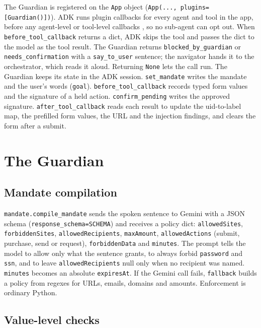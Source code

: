 \documentclass[11pt]{article}
\newcommand{\code}[1]{\texttt{#1}}
\begin{document}
The Guardian is registered on the \code{App} object (\code{App(..., plugins=[Guardian()])}). ADK runs plugin callbacks for every agent and tool in the app, before any agent-level or tool-level callbacks \cite{adkplugins}, so no sub-agent can opt out. When \code{before\_tool\_callback} returns a dict, ADK skips the tool and passes the dict to the model as the tool result. The Guardian returns \code{blocked\_by\_guardian} or \code{needs\_confirmation} with a \code{say\_to\_user} sentence; the navigator hands it to the orchestrator, which reads it aloud. Returning \code{None} lets the call run. The Guardian keeps its state in the ADK session. \code{set\_mandate} writes the mandate and the user's words (\code{goal}). \code{before\_tool\_callback} records typed form values and the signature of a held action. \code{confirm\_pending} writes the approved signature. \code{after\_tool\_callback} reads each result to update the uid-to-label map, the prefilled form values, the URL and the injection findings, and clears the form after a submit.

\section{The Guardian}

\subsection{Mandate compilation}

\code{mandate.compile\_mandate} sends the spoken sentence to Gemini with a JSON schema (\code{response\_schema=SCHEMA}) and receives a policy dict: \code{allowedSites}, \code{forbiddenSites}, \code{allowedRecipients}, \code{maxAmount}, \code{allowedActions} (submit, purchase, send or request), \code{forbiddenData} and \code{minutes}. The prompt tells the model to allow only what the sentence grants, to always forbid \code{password} and \code{ssn}, and to leave \code{allowedRecipients} null only when no recipient was named. \code{minutes} becomes an absolute \code{expiresAt}. If the Gemini call fails, \code{fallback} builds a policy from regexes for URLs, emails, domains and amounts. Enforcement is ordinary Python.

\subsection{Value-level checks}
\label{sec:checks}
\end{document}
